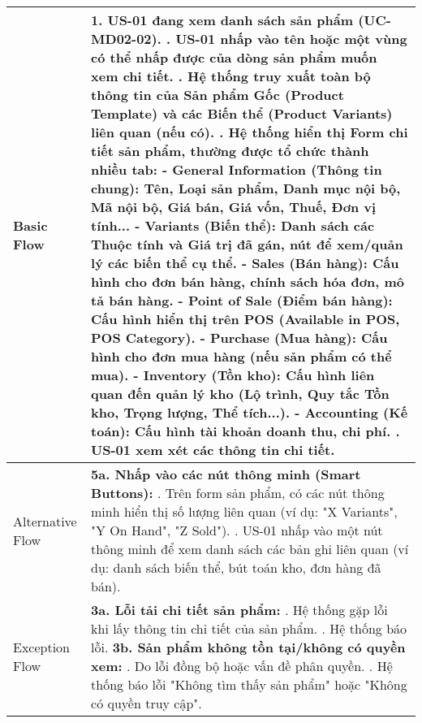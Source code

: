 \begin{longtable}{|m{4cm}|p{11cm}|}
Basic Flow & 1. US-01 đang xem danh sách sản phẩm (UC-MD02-02). \newline 2. US-01 nhấp vào tên hoặc một vùng có thể nhấp được của dòng sản phẩm muốn xem chi tiết. \newline 3. Hệ thống truy xuất toàn bộ thông tin của Sản phẩm Gốc (Product Template) và các Biến thể (Product Variants) liên quan (nếu có). \newline 4. Hệ thống hiển thị Form chi tiết sản phẩm, thường được tổ chức thành nhiều tab: \newline    - \textbf{General Information (Thông tin chung):} Tên, Loại sản phẩm, Danh mục nội bộ, Mã nội bộ, Giá bán, Giá vốn, Thuế, Đơn vị tính... \newline    - \textbf{Variants (Biến thể):} Danh sách các Thuộc tính và Giá trị đã gán, nút để xem/quản lý các biến thể cụ thể. \newline    - \textbf{Sales (Bán hàng):} Cấu hình cho đơn bán hàng, chính sách hóa đơn, mô tả bán hàng. \newline    - \textbf{Point of Sale (Điểm bán hàng):} Cấu hình hiển thị trên POS (Available in POS, POS Category). \newline    - \textbf{Purchase (Mua hàng):} Cấu hình cho đơn mua hàng (nếu sản phẩm có thể mua). \newline    - \textbf{Inventory (Tồn kho):} Cấu hình liên quan đến quản lý kho (Lộ trình, Quy tắc Tồn kho, Trọng lượng, Thể tích...). \newline    - \textbf{Accounting (Kế toán):} Cấu hình tài khoản doanh thu, chi phí. \newline 5. US-01 xem xét các thông tin chi tiết. \\
\hline
Alternative Flow & \textbf{5a. Nhấp vào các nút thông minh (Smart Buttons):} \newline    1. Trên form sản phẩm, có các nút thông minh hiển thị số lượng liên quan (ví dụ: "X Variants", "Y On Hand", "Z Sold"). \newline    2. US-01 nhấp vào một nút thông minh để xem danh sách các bản ghi liên quan (ví dụ: danh sách biến thể, bút toán kho, đơn hàng đã bán). \\
\hline
Exception Flow & \textbf{3a. Lỗi tải chi tiết sản phẩm:} \newline    1. Hệ thống gặp lỗi khi lấy thông tin chi tiết của sản phẩm. \newline    2. Hệ thống báo lỗi. \newline \textbf{3b. Sản phẩm không tồn tại/không có quyền xem:} \newline    1. Do lỗi đồng bộ hoặc vấn đề phân quyền. \newline    2. Hệ thống báo lỗi "Không tìm thấy sản phẩm" hoặc "Không có quyền truy cập". \\

\end{longtable}
